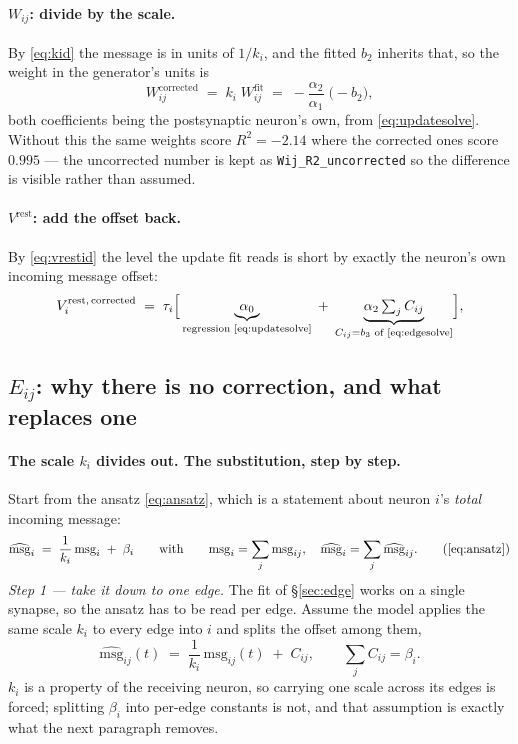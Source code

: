 \documentclass[11pt,a4paper]{article}
\newcommand{\Wij}{W_{ij}}
\newcommand{\Eij}{E_{ij}}
\newcommand{\msg}{\mathrm{msg}}
\begin{document}
\paragraph{$\Wij$: divide by the scale.} By \eqref{eq:kid} the message is in
units of $1/k_i$, and the fitted $b_2$ inherits that, so the weight in the
generator's units is
%
\begin{equation}
\Wij^{\mathrm{corrected}} \;=\; k_i \; \Wij^{\mathrm{fit}}
  \;=\; -\frac{\alpha_2}{\alpha_1} \; \bigl(-b_2\bigr),
\label{eq:wcorr}
\end{equation}
%
both coefficients being the postsynaptic neuron's own, from
\eqref{eq:updatesolve}. Without this the same
weights score $R^2 = -2.14$ where the corrected ones score $0.995$ --- the
uncorrected number is kept as \texttt{Wij\_R2\_uncorrected} so the difference is
visible rather than assumed.

\paragraph{$V^{\mathrm{rest}}$: add the offset back.} By \eqref{eq:vrestid} the
level the update fit reads is short by exactly the neuron's own incoming message
offset:
%
\begin{equation}
V^{\mathrm{rest},\,\mathrm{corrected}}_i
  \;=\; \tau_i\Bigl[\,\underbrace{\alpha_0}_{\text{regression \eqref{eq:updatesolve}}}
  \;+\; \underbrace{\alpha_2 \textstyle\sum_{j} C_{ij}}
        _{C_{ij} = b_3 \text{ of \eqref{eq:edgesolve}}}\Bigr] ,
\label{eq:vcorr}
\end{equation}
%

\subsection{$\Eij$: why there is no correction, and what replaces one}
\label{sec:Ecorr}

\paragraph{The scale $k_i$ divides out. The substitution, step by step.} Start
from the ansatz \eqref{eq:ansatz}, which is a statement about neuron $i$'s
\emph{total} incoming message:
%
\begin{equation}
\widehat{\msg}_i \;=\; \frac{1}{k_i}\,\msg_i \;+\; \beta_i
\qquad\text{with}\qquad
\msg_i = \sum_j \msg_{ij}, \quad \widehat{\msg}_i = \sum_j \widehat{\msg}_{ij} .
\tag{\ref{eq:ansatz}}
\end{equation}
%
\emph{Step 1 --- take it down to one edge.} The fit of \S\ref{sec:edge} works on
a single synapse, so the ansatz has to be read per edge. Assume the model applies
the same scale $k_i$ to every edge into $i$ and splits the offset among them,
%
\begin{equation}
\widehat{\msg}_{ij}(t) \;=\; \frac{1}{k_i}\,\msg_{ij}(t) \;+\; C_{ij},
\qquad \sum_j C_{ij} = \beta_i .
\label{eq:edgeansatz}
\end{equation}
%
$k_i$ is a property of the receiving neuron, so carrying one scale across its
edges is forced; splitting $\beta_i$ into per-edge constants is not, and that
assumption is exactly what the next paragraph removes.
\end{document}

